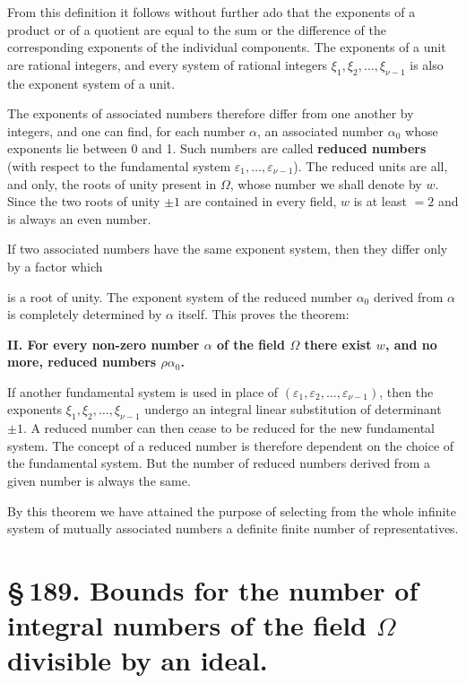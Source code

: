 \documentclass[11pt]{article}
\begin{document}
From this definition it follows without further ado that the exponents of a product or of a quotient are equal to the sum or the difference of the corresponding exponents of the individual components. The exponents of a unit are rational integers, and every system of rational integers $\xi_1,\xi_2,\ldots,\xi_{\nu-1}$ is also the exponent system of a unit.

The exponents of associated numbers therefore differ from one another by integers, and one can find, for each number $\alpha$, an associated number $\alpha_0$ whose exponents lie between 0 and 1. Such numbers are called \textbf{reduced numbers} (with respect to the fundamental system $\varepsilon_1,\ldots,\varepsilon_{\nu-1}$). The reduced units are all, and only, the roots of unity present in $\Omega$, whose number we shall denote by $w$. Since the two roots of unity $\pm1$ are contained in every field, $w$ is at least $=2$ and is always an even number.

If two associated numbers have the same exponent system, then they differ only by a factor which

is a root of unity. The exponent system of the reduced number $\alpha_0$ derived from $\alpha$ is completely determined by $\alpha$ itself. This proves the theorem:

\begin{center}
\textbf{II. For every non-zero number $\alpha$ of the field $\Omega$ there exist $w$, and no more, reduced numbers $\rho\alpha_0$.}
\end{center}

If another fundamental system is used in place of $(\varepsilon_1,\varepsilon_2,\ldots,\varepsilon_{\nu-1})$, then the exponents $\xi_1,\xi_2,\ldots,\xi_{\nu-1}$ undergo an integral linear substitution of determinant $\pm1$. A reduced number can then cease to be reduced for the new fundamental system. The concept of a reduced number is therefore dependent on the choice of the fundamental system. But the number of reduced numbers derived from a given number is always the same.

By this theorem we have attained the purpose of selecting from the whole infinite system of mutually associated numbers a definite finite number of representatives.

\section*{\S\,189. Bounds for the number of integral numbers of the field $\Omega$ divisible by an ideal.}
\end{document}
